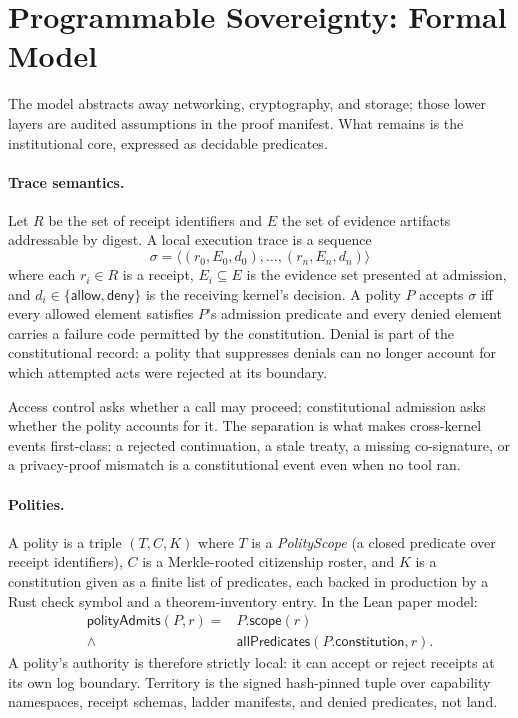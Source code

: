 \section{Programmable Sovereignty: Formal Model}
\label{sec:model}

The model abstracts away networking, cryptography, and storage; those lower layers are audited assumptions in the proof manifest. What remains is the institutional core, expressed as decidable predicates.

\paragraph{Trace semantics.}
Let $R$ be the set of receipt identifiers and $E$ the set of evidence artifacts addressable by digest. A local execution trace is a sequence
\[
  \sigma = \langle (r_0,E_0,d_0),\ldots,(r_n,E_n,d_n)\rangle
\]
where each $r_i\in R$ is a receipt, $E_i\subseteq E$ is the evidence set presented at admission, and $d_i\in\{\mathsf{allow},\mathsf{deny}\}$ is the receiving kernel's decision. A polity $P$ accepts $\sigma$ iff every allowed element satisfies $P$'s admission predicate and every denied element carries a failure code permitted by the constitution. Denial is part of the constitutional record: a polity that suppresses denials can no longer account for which attempted acts were rejected at its boundary.

Access control asks whether a call may proceed; constitutional admission asks whether the polity accounts for it. The separation is what makes cross-kernel events first-class: a rejected continuation, a stale treaty, a missing co-signature, or a privacy-proof mismatch is a constitutional event even when no tool ran.

\paragraph{Polities.}
A polity is a triple $(T,C,K)$ where $T$ is a \emph{PolityScope} (a closed predicate over receipt identifiers), $C$ is a Merkle-rooted citizenship roster, and $K$ is a constitution given as a finite list of predicates, each backed in production by a Rust check symbol and a theorem-inventory entry. In the Lean paper model:
\begin{equation*}
\begin{aligned}
\mathsf{polityAdmits}(P,r) = {} & P.\mathsf{scope}(r) \\
  {} \wedge {} & \mathsf{allPredicates}(P.\mathsf{constitution}, r).
\end{aligned}
\end{equation*}
A polity's authority is therefore strictly local: it can accept or reject receipts at its own log boundary. Territory is the signed hash-pinned tuple over capability namespaces, receipt schemas, ladder manifests, and denied predicates, not land.

